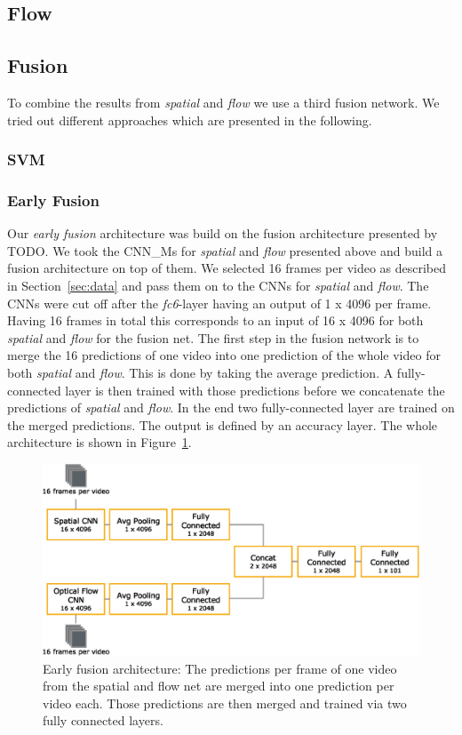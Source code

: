 \subsection{Flow}
\label{subsec:flow}



\subsection{Fusion}
\label{subsec:fusion}

To combine the results from \emph{spatial} and \emph{flow} we use a third fusion network.
We tried out different approaches which are presented in the following.

\subsubsection{SVM}

\subsubsection{Early Fusion}
Our \emph{early fusion} architecture was build on the fusion architecture presented by TODO.
We took the CNN\_Ms for \emph{spatial} and \emph{flow} presented above and build a fusion architecture on top of them.
We selected 16 frames per video as described in Section~\ref{sec:data} and pass them on to the CNNs for \emph{spatial} and \emph{flow}.
The CNNs were cut off after the \textit{fc6}-layer having an output of 1 x 4096 per frame.
Having 16 frames in total this corresponds to an input of 16 x 4096 for both \emph{spatial} and \emph{flow} for the fusion net.
The first step in the fusion network is to merge the 16 predictions of one video into one prediction of the whole video for both \emph{spatial} and \emph{flow}.
This is done by taking the average prediction.
A fully-connected layer is then trained with those predictions before we concatenate the predictions of \emph{spatial} and \emph{flow}.
In the end two fully-connected layer are trained on the merged predictions.
The output is defined by an accuracy layer.
The whole architecture is shown in Figure~\ref{fig:early_fusion}.
\begin{figure}[!htb]
	\centering
	\includegraphics[scale=.7]{images/early_fusion.eps}
	\caption{Early fusion architecture: The predictions per frame of one video from the spatial and flow net are merged into one prediction per video each. Those predictions are then merged and trained via two fully connected layers.}
	\label{fig:early_fusion}
\end{figure}

